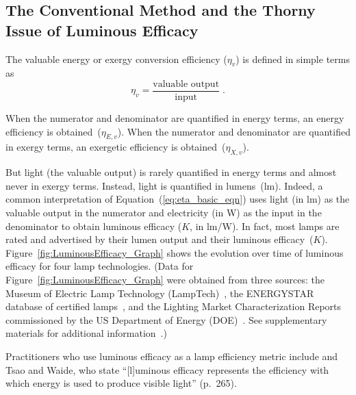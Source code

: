 \documentclass[energies,article,accept,moreauthors,pdftex]{Definitions/mdpi}\usepackage[]{graphicx}\usepackage[]{color}
\newcommand{\ins}[1]{#1}
\newcommand{\enoex}{energy or exergy}
\providecommand{\DIFaddbegin}{} %
\providecommand{\DIFaddend}{} %
\newcommand{\DIFaddincludegraphics}[2][]{{\color{blue}\fbox{\DIFOincludegraphics[#1]{#2}}}} %
\DeclareRobustCommand{\DIFaddbegin}{\DIFOaddbegin \let\includegraphics\DIFaddincludegraphics} %
\DeclareRobustCommand{\DIFaddend}{\DIFOaddend \let\includegraphics\DIFOincludegraphics} %
\begin{document}
\subsection{The Conventional Method and the Thorny Issue of Luminous Efficacy}
\label{sec:conventional_method}

The valuable \enoex{} conversion efficiency ($\eta_v$)
is defined in simple terms as
\begin{equation} \label{eq:eta_basic_eqn}
 \eta_v = \frac{\text{valuable output}}{\text{input}} \; .
\end{equation}

When the numerator and denominator are quantified in energy terms,
an energy efficiency is obtained~($\eta_{E,v}$).
When the numerator and denominator are quantified in exergy terms,
an exergetic efficiency is obtained~($\eta_{X,v}$).

But light (the valuable output) is rarely quantified in energy terms
and almost never in exergy terms.
Instead, light is quantified in lumens~(lm).
Indeed, a common interpretation of \mbox{Equation~(\ref{eq:eta_basic_eqn})} uses
light (in lm) as the valuable output in the numerator and 
electricity (in W) as the input in the denominator
to obtain luminous efficacy ($K$, in lm/W).
In fact, most lamps are rated and advertised by their lumen output and their luminous efficacy~($K$).
Figure~\ref{fig:LuminousEfficacy_Graph} shows the evolution over time 
of luminous efficacy for four lamp technologies.
\DIFaddbegin \ins{(Data for Figure~\ref{fig:LuminousEfficacy_Graph} were obtained from three sources: 
the Museum of Electric Lamp Technology (LampTech)~\cite{hooker_2020}, 
the ENERGYSTAR database of certified lamps~\cite{energystar_2020}, and 
the Lighting Market Characterization Reports commissioned by the 
US Department of Energy (DOE)~\cite{DOE2002, DOE2012, DOE2017}.
See supplementary materials for additional information~\cite{heun2020}.)}

\DIFaddend Practitioners who use luminous efficacy 
as a lamp efficiency metric include \citet{Nordhaus1996} and
Tsao and Waide, 
who state 
``[l]uminous efficacy represents the efficiency 
with which energy is used to produce visible light'' \citep{Tsao2010appetitelight} (p.~265).
\end{document}
